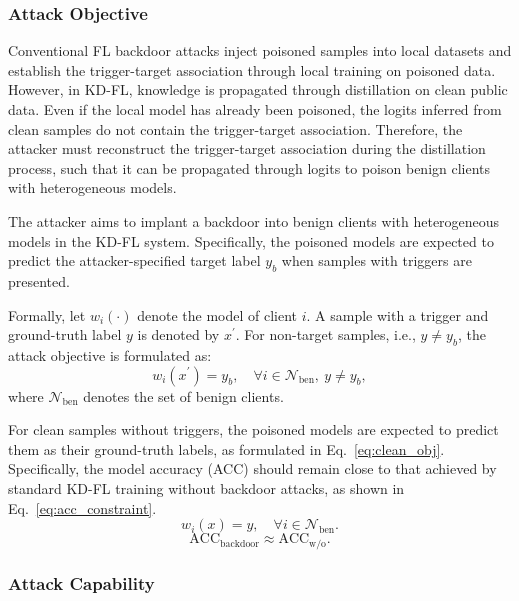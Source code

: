 \documentclass[lettersize,journal]{IEEEtran}
\begin{document}
\subsubsection{Attack Objective}

Conventional FL backdoor attacks inject poisoned samples into local datasets and establish the trigger-target association through local training on poisoned data.
However, in KD-FL, knowledge is propagated through distillation on clean public data.
Even if the local model has already been poisoned, the logits inferred from clean samples do not contain the trigger-target association.
Therefore, the attacker must reconstruct the trigger-target association during the distillation process, such that it can be propagated through logits to poison benign clients with heterogeneous models.

The attacker aims to implant a backdoor into benign clients with heterogeneous models in the KD-FL system. 
Specifically, the poisoned models are expected to predict the attacker-specified target label \(y_b\) when samples with triggers are presented. 

Formally, let \(w_i(\cdot)\) denote the model of client \(i\).
A sample with a trigger and ground-truth label \(y\) is denoted by \(x^{\prime}\).
For non-target samples, i.e., \(y\neq y_b\), the attack objective is formulated as:
\begin{equation}
w_i(x^{\prime})=y_b,\quad
\forall i\in \mathcal{N}_\mathrm{ben},\ y\neq y_b,
\label{eq:attack_objective}
\end{equation}
where \(\mathcal{N}_\mathrm{ben}\) denotes the set of benign clients.


For clean samples without triggers, the poisoned models are expected to predict them as their ground-truth labels, as formulated in Eq.~\ref{eq:clean_obj}. 
Specifically, the model accuracy (ACC) should remain close to that achieved by standard KD-FL training without backdoor attacks, as shown in Eq.~\ref{eq:acc_constraint}.
\begin{equation}
w_i(x)=y,\quad
\forall i\in \mathcal{N}_{\mathrm{ben}}.
\label{eq:clean_obj}
\end{equation}
\begin{equation}
\mathrm{ACC}_{\mathrm{backdoor}} \approx \mathrm{ACC}_{\mathrm{w/o}}.
\label{eq:acc_constraint}
\end{equation}

\subsubsection{Attack Capability}
\end{document}
